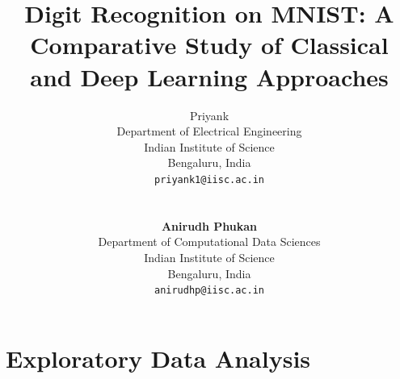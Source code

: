 \documentclass{article}
\title{Digit Recognition on MNIST: A Comparative Study of Classical and Deep Learning Approaches}
\author{%
  Priyank \\
  Department of Electrical Engineering\\
  Indian Institute of Science\\
  Bengaluru, India \\
  \texttt{priyank1@iisc.ac.in} \\
  \\
  \\
  \textbf{Anirudh Phukan} \\
  Department of Computational Data Sciences\\
  Indian Institute of Science\\
  Bengaluru, India \\
  \texttt{anirudhp@iisc.ac.in} \\
}
\begin{document}
\maketitle

\begin{abstract}
\end{abstract}
\section{Exploratory Data Analysis}
\end{document}
